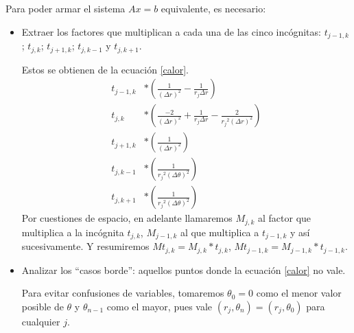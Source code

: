 Para poder armar el sistema $Ax=b$ equivalente, es necesario:
\begin{itemize}
 \item
    Extraer los factores que multiplican a cada una de las cinco incógnitas: $t_{j-1,k}$; $t_{j,k}$; $t_{j+1,k}$; $t_{j,k-1}$ y $t_{j,k+1}$.

    Estos se obtienen de la ecuación \ref{calor}.
    \begin{align*}
        t_{j-1, k}&*(\frac{1}{(\Delta r)^2} - \frac{1}{r_j \Delta r}) \\
        t_{j, k}  &*(\frac{-2}{(\Delta r)^2} + \frac{1}{r_j \Delta r} - \frac{2}{{r_j}^2 (\Delta r)^2}) \\
        t_{j+1, k}&*(\frac{1}{(\Delta r)^2}) \\
        t_{j, k-1}&*(\frac{1}{{r_j}^2(\Delta \theta)^2}) \\
        t_{j, k+1}&*(\frac{1}{{r_j}^2(\Delta \theta)^2})
    \end{align*}
    Por cuestiones de espacio, en adelante llamaremos $M_{j,k}$ al factor que multiplica a la incógnita $t_{j,k}$, $M_{j-1,k}$ al que multiplica a $t_{j-1,k}$ y así sucesivamente. Y resumiremos $Mt_{j,k} = M_{j,k}*t_{j,k}$, $Mt_{j-1,k}=M_{j-1,k}*t_{j-1,k}$.
 \item
    Analizar los ``casos borde'': aquellos puntos donde la ecuación \ref{calor} no vale.
    
    Para evitar confusiones de variables, tomaremos $\theta_0 = 0$ como el menor valor posible de $\theta$ y $\theta_{n-1}$ como el mayor, pues vale $(r_j, \theta_n) = (r_j, \theta_0)$ para cualquier $j$. 
    

\end{itemize}
